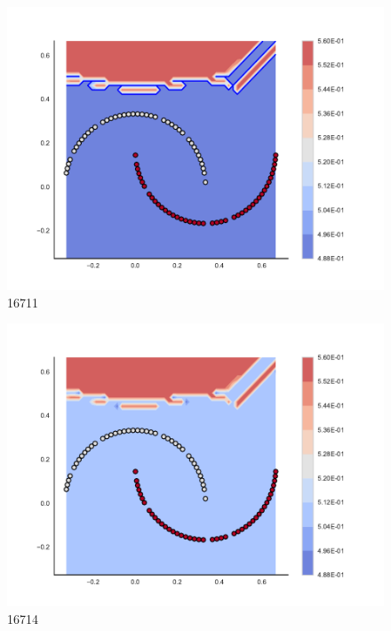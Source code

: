 \begin{subfigure}[b]{0.09\textwidth}
    \includegraphics[clip, trim=2.35cm 1.75cm 4.5cm 0cm,width=\textwidth]{img/convergence/16711.pdf}
    \caption{16711}
    \label{fig:convergence_16711}
\end{subfigure}
%
\begin{subfigure}[b]{0.09\textwidth}
    \includegraphics[clip, trim=2.35cm 1.75cm 4.5cm 0cm,width=\textwidth]{img/convergence/16714.pdf}
    \caption{16714}
    \label{fig:convergence_16714}
\end{subfigure}
%
